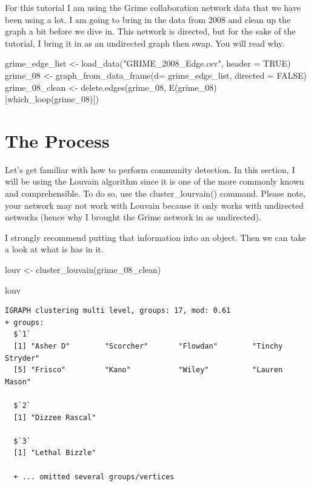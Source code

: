 \documentclass[
  letterpaper,
  DIV=11,
  numbers=noendperiod]{scrreprt}
\newenvironment{Shaded}{\begin{snugshade}}{\end{snugshade}}
\newcommand{\AttributeTok}[1]{\textcolor[rgb]{0.40,0.45,0.13}{#1}}
\newcommand{\ConstantTok}[1]{\textcolor[rgb]{0.56,0.35,0.01}{#1}}
\newcommand{\FunctionTok}[1]{\textcolor[rgb]{0.28,0.35,0.67}{#1}}
\newcommand{\NormalTok}[1]{\textcolor[rgb]{0.00,0.23,0.31}{#1}}
\newcommand{\OtherTok}[1]{\textcolor[rgb]{0.00,0.23,0.31}{#1}}
\newcommand{\StringTok}[1]{\textcolor[rgb]{0.13,0.47,0.30}{#1}}
\begin{document}
For this tutorial I am using the Grime collaboration network data that
we have been using a lot. I am going to bring in the data from 2008 and
clean up the graph a bit before we dive in. This network is directed,
but for the sake of the tutorial, I bring it in as an undirected graph
then swap. You will read why.

\begin{Shaded}
\begin{Highlighting}[]
\NormalTok{grime\_edge\_list }\OtherTok{\textless{}{-}} \FunctionTok{load\_data}\NormalTok{(}\StringTok{"GRIME\_2008\_Edge.csv"}\NormalTok{, }\AttributeTok{header =} \ConstantTok{TRUE}\NormalTok{)}
\NormalTok{grime\_08 }\OtherTok{\textless{}{-}} \FunctionTok{graph\_from\_data\_frame}\NormalTok{(}\AttributeTok{d=}\NormalTok{ grime\_edge\_list, }\AttributeTok{directed =} \ConstantTok{FALSE}\NormalTok{)}
\NormalTok{grime\_08\_clean }\OtherTok{\textless{}{-}} \FunctionTok{delete.edges}\NormalTok{(grime\_08, }\FunctionTok{E}\NormalTok{(grime\_08)[}\FunctionTok{which\_loop}\NormalTok{(grime\_08)])}
\end{Highlighting}
\end{Shaded}

\section{The Process}\label{the-process}

Let's get familiar with how to perform community detection. In this
section, I will be using the Louvain algorithm since it is one of the
more commonly known and comprehensible. To do so, use the
cluster\_lourvain() command. Please note, your network may not work with
Louvain because it only works with undirected networks (hence why I
brought the Grime network in as undirected).

I strongly recommend putting that information into an object. Then we
can take a look at what is has in it.

\begin{Shaded}
\begin{Highlighting}[]
\NormalTok{louv }\OtherTok{\textless{}{-}} \FunctionTok{cluster\_louvain}\NormalTok{(grime\_08\_clean)}

\NormalTok{louv}
\end{Highlighting}
\end{Shaded}

\begin{verbatim}
IGRAPH clustering multi level, groups: 17, mod: 0.61
+ groups:
  $`1`
  [1] "Asher D"        "Scorcher"       "Flowdan"        "Tinchy Stryder"
  [5] "Frisco"         "Kano"           "Wiley"          "Lauren Mason"  
  
  $`2`
  [1] "Dizzee Rascal"
  
  $`3`
  [1] "Lethal Bizzle"
  
  + ... omitted several groups/vertices
\end{verbatim}
\end{document}
